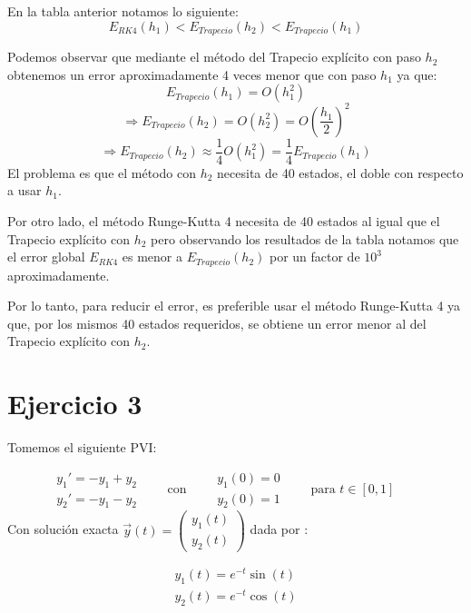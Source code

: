 \documentclass[11pt]{article}
\begin{document}
    En la tabla anterior notamos lo siguiente:
\[E_{RK4}(h_1)<E_{Trapecio}(h_2)<E_{Trapecio}(h_1)\]

    Podemos observar que mediante el método del Trapecio explícito con paso
\(h_2\) obtenemos un error aproximadamente 4 veces menor que con paso
\(h_1\) ya que: \[E_{Trapecio}(h_1)=O(h_1^2)\]
\[   \Rightarrow E_{Trapecio}(h_2)=O(h_2^2)=O\left(\frac{h_1}{2}\right)^2\]
\[ \Rightarrow E_{Trapecio}(h_2) \approx \frac{1}{4}O(h_1^2)=\frac{1}{4}E_{Trapecio}(h_1) \]
El problema es que el método con \(h_2\) necesita de 40 estados, el
doble con respecto a usar \(h_1\).

    Por otro lado, el método Runge-Kutta 4 necesita de 40 estados al igual
que el Trapecio explícito con \(h_2\) pero observando los resultados de
la tabla notamos que el error global \(E_{RK4}\) es menor a
\(E_{Trapecio}(h_2)\) por un factor de \(10^3\) aproximadamente.

    Por lo tanto, para reducir el error, es preferible usar el método
Runge-Kutta 4 ya que, por los mismos 40 estados requeridos, se obtiene
un error menor al del Trapecio explícito con \(h_2\).

\section*{Ejercicio 3}

Tomemos el siguiente PVI:

\begin{equation} \label{eq:3}
 \begin{array}{c} y_1' = - y_1 + y_2 \\
y_2' =- y_1 - y_2 \end{array} 
\qquad \mbox{con} \qquad \begin{array}{c}
y_1(0)=0 \\ y_2(0)=1 \end{array} \qquad \mbox{para } t\in [0,1] \qquad 
\end{equation}
Con solución exacta
\(\overrightarrow{y}(t)=\left(\begin{array}{c} y_1(t) \\ y_2(t)\end{array} \right)\)
dada por :

\begin{equation} \label{eq:4}
 \begin{array}{c} y_1(t) = e^{-t}\sin(t) \\
y_2(t) = e^{-t}\cos(t) \end{array}
\end{equation}
\end{document}
